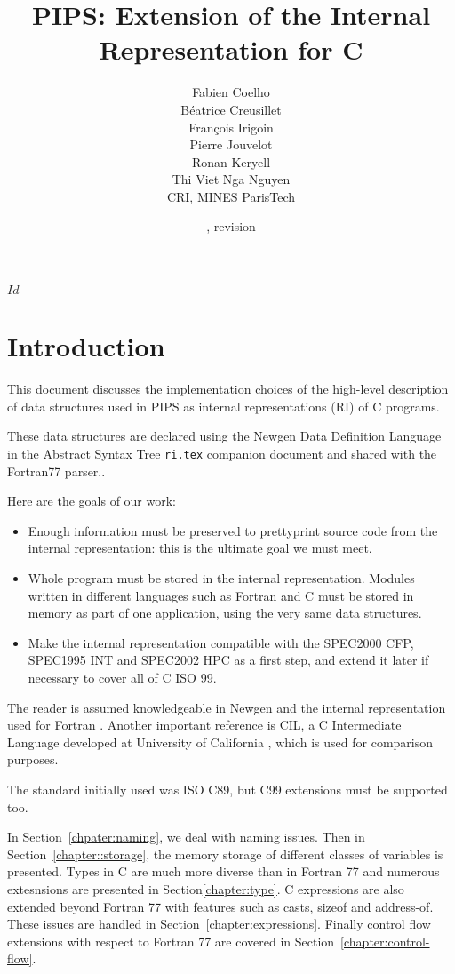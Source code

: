 \documentclass[a4paper]{report}
\title{PIPS: Extension of the Internal Representation for C}
\author{Fabien Coelho \\
  Béatrice Creusillet \\
  François Irigoin \\
  Pierre Jouvelot \\
  Ronan Keryell \\
  Thi Viet Nga Nguyen \\
  CRI, MINES ParisTech}
\date{\svnInfoLongDate{}, revision \svnInfoRevision}
\begin{document}
\svnInfo $Id$

\noindent
\maketitle
\tableofcontents


\chapter*{Introduction}

This document discusses the implementation choices of the high-level
description of data structures used in PIPS as internal representations
(RI) of C programs.

These data structures are declared using the Newgen Data Definition
Language in the Abstract Syntax Tree \texttt{ri.tex} companion
document and shared with the Fortran77 parser..

Here are the goals of our work:
\begin{itemize}
\item Enough information must be preserved to prettyprint source code
  from the internal representation: this is the ultimate goal we must
  meet.
\item Whole program must be stored in the internal
  representation. Modules written in different languages such as
  Fortran and C must be stored in memory as part of one application,
  using the very same data structures.
\item Make the internal representation compatible with the SPEC2000
  CFP, SPEC1995 INT and SPEC2002 HPC as a first step, and extend it
  later if necessary to cover all of C ISO 99.
\end{itemize}
The reader is assumed knowledgeable in Newgen \cite{Jouv90} and the
internal representation used for Fortran \cite{Coel01}. Another
important reference is CIL, a C Intermediate Language developed at
University of California \cite{Necu02}, which is used for comparison
purposes.

The standard initially used was ISO C89, but C99 extensions must be
supported too.

In Section~\ref{chpater:naming}, we deal with naming issues. Then in
Section~\ref{chapter::storage}, the memory storage of different
classes of variables is presented. Types in C are much more diverse
than in Fortran 77 and numerous extesnsions are presented in
Section\ref{chapter:type}. C expressions are also extended beyond
Fortran 77 with features such as casts, sizeof and address-of. These
issues are handled in Section~\ref{chapter:expressions}. Finally
control flow extensions with respect to Fortran 77 are covered in
Section~\ref{chapter:control-flow}.
\end{document}
